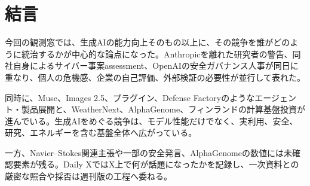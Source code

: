 \section{結言}
今回の観測窓では、生成AIの能力向上そのもの以上に、その競争を誰がどのように統治するかが中心的な論点になった。Anthropicを離れた研究者の警告、同社自身によるサイバー事案assessment、OpenAIの安全ガバナンス人事が同日に重なり、個人の危機感、企業の自己評価、外部検証の必要性が並行して表れた。

同時に、Muse、Images 2.5、プラグイン、Defense Factoryのようなエージェント・製品展開と、WeatherNext、AlphaGenome、フィンランドの計算基盤投資が進んでいる。生成AIをめぐる競争は、モデル性能だけでなく、実利用、安全、研究、エネルギーを含む基盤全体へ広がっている。

一方、Navier--Stokes関連主張や一部の安全発言、AlphaGenomeの数値には未確認要素が残る。Daily XではX上で何が話題になったかを記録し、一次資料との厳密な照合や採否は週刊版の工程へ委ねる。
